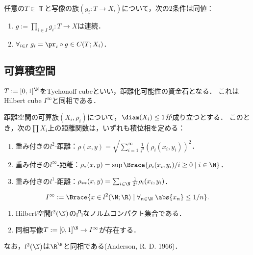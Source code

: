 \documentclass[uplatex,dvipdfmx]{jsreport}
\begin{document}
\begin{proposition}[積空間の普遍性]
    任意の$T\in\Top$と写像の族$(g_i:T\to X_i)$について，次の2条件は同値：
    \begin{enumerate}
        \item $g:=\prod_{i\in I}g_i:T\to X$は連続．
        \item $\forall_{i\in I}\;g_i=\pr_i\circ g\in C(T;X_i)$．
    \end{enumerate}
\end{proposition}

\subsection{可算積空間}

\begin{tcolorbox}[colframe=ForestGreen, colback=ForestGreen!10!white,breakable,colbacktitle=ForestGreen!40!white,coltitle=black,fonttitle=\bfseries\sffamily,
title=]
    
    $T:=[0,1]^\N$をTychonoff cubeといい，距離化可能性の資金石となる．
    これはHilbert cube $I^\infty$と同相である．
\end{tcolorbox}

\begin{theorem}[積位相を定める距離]
    距離空間の可算族$(X_i,\rho_i)$について，$\diam(X_i)\le1$が成り立つとする．
    このとき，次の$\prod X_i$上の距離関数は，いずれも積位相を定める：
    \begin{enumerate}
        \item 重み付きの$l^2$-距離：$\rho(x,y)=\sqrt{\sum_{i=1}^\infty\frac{1}{i^2}(\rho_i(x_i,y_i))^2}$．
        \item 重み付きの$l^\infty$-距離：$\rho_*(x,y)=\sup\Brace{\rho_i(x_i,y_i)/i\ge0\mid i\in\N}$．
        \item 重み付きの$l^1$-距離：$\rho_{**}(x,y)=\sum_{i\in\N}\frac{1}{2^i}\rho_i(x_i,y_i)$．
    \end{enumerate}
\end{theorem}

\begin{proposition}
    \[I^\infty:=\Brace{x\in l^2(\N;\R)\mid\forall_{n\in\N}\;\abs{x_n}\le1/n}.\]
    \begin{enumerate}
        \item Hilbert空間$l^2(\N)$の凸なノルムコンパクト集合である．
        \item 同相写像$T:=[0,1]^\N\to I^\infty$が存在する．
    \end{enumerate}
\end{proposition}
\begin{remark}
    なお，$l^2(\N)$は$\R^\N$と同相である(Anderson, R. D. 1966)．
\end{remark}
\end{document}
